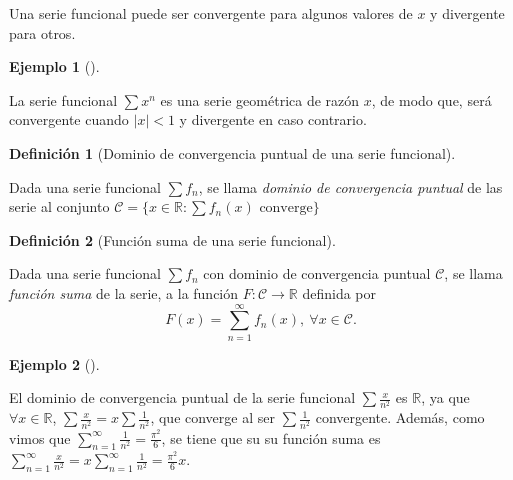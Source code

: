 \documentclass[
  a4paper,
]{scrreport}
\theoremstyle{plain}
\theoremstyle{plain}
\theoremstyle{definition}
\newtheorem{definition}{Definición}[chapter]
\theoremstyle{plain}
\theoremstyle{definition}
\newtheorem{example}{Ejemplo}[chapter]
\theoremstyle{remark}
\begin{document}
Una serie funcional puede ser convergente para algunos valores de \(x\)
y divergente para otros.

\leavevmode{}%
\begin{example}[]\label{exm-convergencia-puntual}

La serie funcional \(\sum x^n\) es una serie geométrica de razón \(x\),
de modo que, será convergente cuando \(|x|<1\) y divergente en caso
contrario.

\end{example}

\leavevmode{}%
\begin{definition}[Dominio de convergencia puntual de una serie
funcional]\label{def-dominio-convergencia-puntual-serie-funcional}

Dada una serie funcional \(\sum f_n\), se llama \emph{dominio de
convergencia puntual} de las serie al conjunto
\(\mathcal{C}=\{x\in\mathbb{R}: \sum f_n(x) \mbox{ converge}\}\)

\end{definition}

\leavevmode{}%
\begin{definition}[Función suma de una serie
funcional]\label{def-funcion-suma}

Dada una serie funcional \(\sum f_n\) con dominio de convergencia
puntual \(\mathcal{C}\), se llama \emph{función suma} de la serie, a la
función \(F:\mathcal{C}\to\mathbb{R}\) definida por \[
F(x) = \sum_{n=1}^\infty f_n(x),\ \forall x\in \mathcal{C}.
\]

\end{definition}

\leavevmode{}%
\begin{example}[]\label{exm-funcion-suma}

El dominio de convergencia puntual de la serie funcional
\(\sum \frac{x}{n^2}\) es \(\mathbb{R}\), ya que
\(\forall x\in\mathbb{R}\), \(\sum \frac{x}{n^2}=x\sum\frac{1}{n^2}\),
que converge al ser \(\sum \frac{1}{n^2}\) convergente. Además, como
vimos que \(\sum_{n=1}^\infty \frac{1}{n^2}=\frac{\pi^2}{6}\), se tiene
que su su función suma es
\(\sum_{n=1}^\infty \frac{x}{n^2} = x\sum_{n=1}^\infty \frac{1}{n^2}= \frac{\pi^2}{6}x\).

\end{example}
\end{document}
